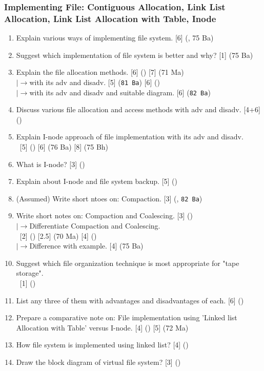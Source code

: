 \documentclass[12pt]{article}
\newcommand{\lb}{\\$\left|\rightarrow\right.$}
\newcommand{\enter}{\\\textcolor{white}{1}}
\begin{document}
		\subsubsection{Implementing File: Contiguous Allocation, Link List Allocation, Link List Allocation with Table, Inode}
			\begin{enumerate}[noitemsep, topsep=0pt]
				\item Explain various ways of implementing file system. \hfill [6] (, 75 Ba)

				\item Suggest which implementation of file system is better and why? \hfill [1] (75 Ba)

				\item Explain the file allocation methods. \hfill [6] () [7] (71 Ma)
				\lb with its adv and disadv. \hfill [5] (\texttt{81 Ba}) [6] ()
				\lb with its adv and disadv and suitable diagram. \hfill [6] (\texttt{82 Ba})

				\item Discuss various file allocation and access methods with adv and disadv. \hfill [4+6] ()

				\item Explain I-node approach of file implementation with its adv and disadv.
				\enter\hfill [5] () [6] (76 Ba) [8] (75 Bh)

				\item What is I-node? \hfill [3] ()

				\item Explain about I-node and file system backup. \hfill [5] ()

				\item (Assumed) Write short ntoes on: Compaction. \hfill [3] (, \texttt{82 Ba})
				
				\item Write short notes on: Compaction and Coalescing. \hfill [3] ()
				\lb Differentiate Compaction and Coalescing.
				\enter\hfill [2] () [2.5] (70 Ma) [4] ()
				\lb Difference with example. \hfill [4] (75 Ba)

				\item Suggest which file organization technique is most appropriate for "tape storage".
				\enter\hfill [1] ()

				\item List any three of them with advantages and disadvantages of each. \hfill [6] ()

				\item Prepare a comparative note on: File implementation using 'Linked list Allocation with Table' versus I-node. \hfill [4] () [5] (72 Ma)

				\item How file system is implemented using linked list? \hfill [4] ()

				\item Draw the block diagram of virtual file system? \hfill [3] ()
			\end{enumerate}
\end{document}
